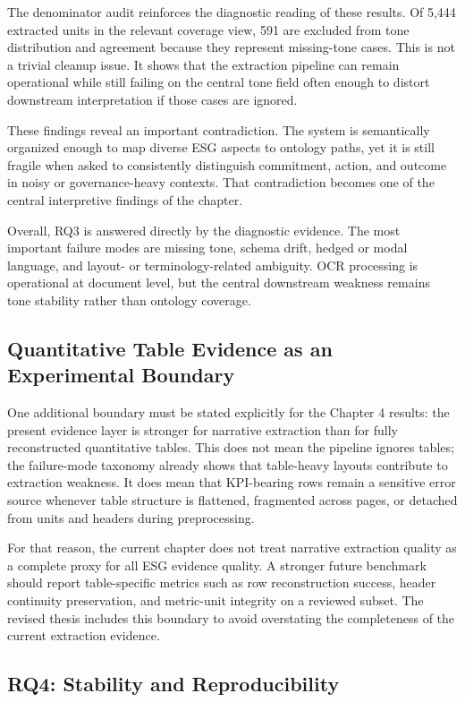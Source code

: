 The denominator audit reinforces the diagnostic reading of these results. Of 5,444 extracted units in the relevant coverage view, 591 are excluded from tone distribution and agreement because they represent missing-tone cases. This is not a trivial cleanup issue. It shows that the extraction pipeline can remain operational while still failing on the central tone field often enough to distort downstream interpretation if those cases are ignored.

These findings reveal an important contradiction. The system is semantically organized enough to map diverse ESG aspects to ontology paths, yet it is still fragile when asked to consistently distinguish commitment, action, and outcome in noisy or governance-heavy contexts. That contradiction becomes one of the central interpretive findings of the chapter.

Overall, RQ3 is answered directly by the diagnostic evidence. The most important failure modes are missing tone, schema drift, hedged or modal language, and layout- or terminology-related ambiguity. OCR processing is operational at document level, but the central downstream weakness remains tone stability rather than ontology coverage.

\subsection{Quantitative Table Evidence as an Experimental Boundary}

One additional boundary must be stated explicitly for the Chapter 4 results: the present evidence layer is stronger for narrative extraction than for fully reconstructed quantitative tables. This does not mean the pipeline ignores tables; the failure-mode taxonomy already shows that table-heavy layouts contribute to extraction weakness. It does mean that KPI-bearing rows remain a sensitive error source whenever table structure is flattened, fragmented across pages, or detached from units and headers during preprocessing.

For that reason, the current chapter does not treat narrative extraction quality as a complete proxy for all ESG evidence quality. A stronger future benchmark should report table-specific metrics such as row reconstruction success, header continuity preservation, and metric-unit integrity on a reviewed subset. The revised thesis includes this boundary to avoid overstating the completeness of the current extraction evidence.

\subsection{RQ4: Stability and Reproducibility}

